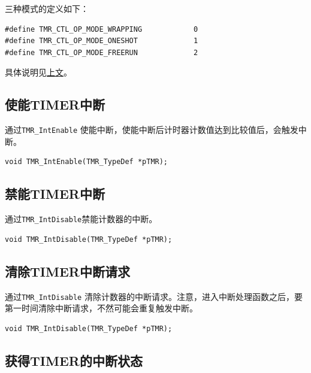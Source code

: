 \documentclass[
  12pt,
]{book}
\begin{document}
三种模式的定义如下：

\begin{verbatim}
#define TMR_CTL_OP_MODE_WRAPPING            0
#define TMR_CTL_OP_MODE_ONESHOT             1
#define TMR_CTL_OP_MODE_FREERUN             2
\end{verbatim}

具体说明见\protect\hyperlink{function}{上文}。

\hypertarget{ux4f7fux80fdtimerux4e2dux65ad}{%
\subsection{使能TIMER中断}\label{ux4f7fux80fdtimerux4e2dux65ad}}

通过\texttt{TMR\_IntEnable} 使能中断，使能中断后计时器计数值达到比较值后，会触发中断。

\begin{verbatim}
void TMR_IntEnable(TMR_TypeDef *pTMR);
\end{verbatim}

\hypertarget{ux7981ux80fdtimerux4e2dux65ad}{%
\subsection{禁能TIMER中断}\label{ux7981ux80fdtimerux4e2dux65ad}}

通过\texttt{TMR\_IntDisable}禁能计数器的中断。

\begin{verbatim}
void TMR_IntDisable(TMR_TypeDef *pTMR);
\end{verbatim}

\hypertarget{ux6e05ux9664timerux4e2dux65adux8bf7ux6c42}{%
\subsection{清除TIMER中断请求}\label{ux6e05ux9664timerux4e2dux65adux8bf7ux6c42}}

通过\texttt{TMR\_IntDisable} 清除计数器的中断请求。注意，进入中断处理函数之后，要第一时间清除中断请求，不然可能会重复触发中断。

\begin{verbatim}
void TMR_IntDisable(TMR_TypeDef *pTMR);
\end{verbatim}

\hypertarget{ux83b7ux5f97timerux7684ux4e2dux65adux72b6ux6001}{%
\subsection{获得TIMER的中断状态}\label{ux83b7ux5f97timerux7684ux4e2dux65adux72b6ux6001}}
\end{document}

